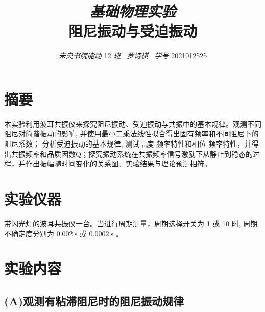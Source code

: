 \documentclass[11pt,a4paper,UTF8]{ctexart}
\title{\textit{\large 基础物理实验}\\[2mm]
		\textbf{\LARGE 阻尼振动与受迫振动}}
\author{\textit{未央书院能动} 12 \textit{班 \ 罗诗棋 \ 学号} 2021012525}
\date{}
\begin{document}
\tableofcontents
\maketitle

\section{摘要}

本实验利用波耳共振仪来探究阻尼振动、受迫振动与共振中的基本规律。观测不同阻尼对简谐振动的影响, 并使用最小二乘法线性拟合得出固有频率和不同阻尼下的阻尼系数；
分析受迫振动的基本规律, 测试幅度-频率特性和相位-频率特性，并得出共振频率和品质因数Q；探究振动系统在共振频率信号激励下从静止到稳态的过程，并作出振幅随时间变化的关系图。实验结果与理论预测相符。

\section{实验仪器}

带闪光灯的波耳共振仪一台。当进行周期测量，周期选择开关为 1 或 10 时, 周期不确定度分别为 $0.002 \mathrm{~s}$ 或 $0.0002 \mathrm{~s}$ 。

\section{实验内容}

\subsection{(A)观测有粘滞阻尼时的阻尼振动规律}
\end{document}
